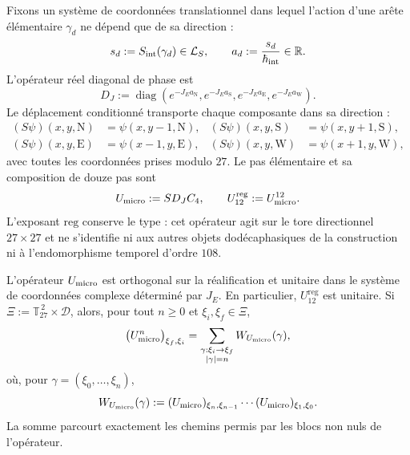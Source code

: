 Fixons un système de coordonnées translationnel dans lequel l’action d’une arête élémentaire
\(\gamma_d\) ne dépend que de sa direction :
\[
 s_d:=S_{\rm int}(\gamma_d)\in\mathcal L_S,
 \qquad
 a_d:=\frac{s_d}{\hbar_{\rm int}}\in\mathbb R.
\]
L’opérateur réel diagonal de phase est
\[
 D_J:=\operatorname{diag}
 \left(
  e^{-J_Ea_{\mathrm N}},
  e^{-J_Ea_{\mathrm S}},
  e^{-J_Ea_{\mathrm E}},
  e^{-J_Ea_{\mathrm W}}
 \right).
\]
Le déplacement conditionné transporte chaque composante dans sa direction :
\begin{align*}
 (S\psi)(x,y,\mathrm N)&=\psi(x,y-1,\mathrm N),&
 (S\psi)(x,y,\mathrm S)&=\psi(x,y+1,\mathrm S),\\
 (S\psi)(x,y,\mathrm E)&=\psi(x-1,y,\mathrm E),&
 (S\psi)(x,y,\mathrm W)&=\psi(x+1,y,\mathrm W),
\end{align*}
avec toutes les coordonnées prises modulo \(27\). Le pas élémentaire et sa
composition de douze pas sont
\begin{equation}
 U_{\rm micro}:=S D_J C_4,
 \qquad
 U_{12}^{\mathrm{reg}}:=U_{\rm micro}^{12}.
 \label{eq:paso-unitario-registro-27-rev3}
\end{equation}
L’exposant \(\mathrm{reg}\) conserve le type : cet opérateur agit sur
le tore directionnel \(27\times27\) et ne s’identifie ni aux autres objets
dodécaphasiques de la construction ni à l’endomorphisme temporel d’ordre \(108\).


\begin{proposition}
\label{prop:unitariedad-suma-registro-27-rev3}
L’opérateur \(U_{\rm micro}\) est orthogonal sur la réalification et unitaire
dans le système de coordonnées complexe déterminé par \(J_E\). En particulier,
\(U_{12}^{\mathrm{reg}}\) est unitaire. Si
\(\Xi:=\mathbb T_{27}^{\,2}\times\mathcal D\), alors, pour tout
\(n\geq0\) et \(\xi_i,\xi_f\in\Xi\),
\[
 \bigl(U_{\rm micro}^{n}\bigr)_{\xi_f,\xi_i}
 =
 \sum_{\substack{\gamma:\xi_i\to\xi_f\\|\gamma|=n}}
 W_{U_{\rm micro}}(\gamma),
\]
où, pour \(\gamma=(\xi_0,\ldots,\xi_n)\),
\[
 W_{U_{\rm micro}}(\gamma)
 :=
 (U_{\rm micro})_{\xi_n,\xi_{n-1}}
 \cdots
 (U_{\rm micro})_{\xi_1,\xi_0}.
\]
La somme parcourt exactement les chemins permis par les blocs non nuls
de l’opérateur.
\end{proposition}

